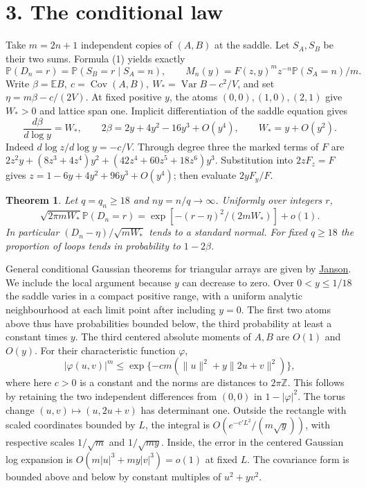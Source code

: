 \documentclass[11pt,letterpaper]{article}
\newcommand{\Prb}{\mathbb P}
\newcommand{\EE}{\mathbb E}
\newcommand{\Var}{\operatorname{Var}}
\newcommand{\Cov}{\operatorname{Cov}}
\newtheorem{theorem}{Theorem}
\begin{document}
\section*{3. The conditional law}
Take \(m=2n+1\) independent copies of \((A,B)\) at the saddle.
Let \(S_A,S_B\) be their two sums. Formula (1) yields exactly
\[
 \Prb(D_n=r)=\Prb(S_B=r\mid S_A=n),\qquad
 M_n(y)=F(z,y)^m z^{-n}\Prb(S_A=n)/m.
 \tag{5}
\]
Write \(\beta=\EE B,\ c=\Cov(A,B),\ W_*=\Var B-c^2/V\), and set
\(\eta=m\beta-c/(2V)\). At fixed positive \(y\), the atoms
\((0,0),(1,0),(2,1)\) give \(W_*>0\) and lattice span one.
Implicit differentiation of the saddle equation gives
\[
 \frac{d\beta}{d\log y}=W_*,\qquad
 2\beta=2y+4y^2-16y^3+O(y^4),\qquad W_*=y+O(y^2).
 \tag{6}
\]
Indeed \(d\log z/d\log y=-c/V\). Through degree three the marked
terms of \(F\) are \(2z^2y+(8z^3+4z^4)y^2+
(42z^4+60z^5+18z^6)y^3\). Substitution into \(2zF_z=F\)
gives \(z=1-6y+4y^2+96y^3+O(y^4)\); then evaluate \(2yF_y/F\).
\begin{theorem}
Let \(q=q_n\ge18\) and \(ny=n/q\to\infty\). Uniformly over
integers \(r\),
\[
 \sqrt{2\pi mW_*}\Prb(D_n=r)
 =\exp[-(r-\eta)^2/(2mW_*)]+o(1).
 \tag{7}
\]
In particular \((D_n-\eta)/\sqrt{mW_*}\) tends to a standard normal.
For fixed \(q\ge18\) the proportion of loops tends in probability
to \(1-2\beta\).
\end{theorem}
General conditional Gaussian theorems for triangular arrays are given
by \href{https://doi.org/10.1239/jap/996986753}{Janson}.
We include the local argument because \(y\) can decrease to zero.
Over \(0<y\le1/18\) the saddle varies in a compact positive range,
with a uniform analytic neighbourhood at each limit point after
including \(y=0\). The first two atoms above thus have probabilities
bounded below, the third probability at least a constant times \(y\).
The third centered absolute moments of \(A,B\) are \(O(1)\) and
\(O(y)\). For their characteristic function \(\varphi\),
\[
 |\varphi(u,v)|^m\le
 \exp\{-cm(\|u\|^2+y\|2u+v\|^2)\},
\]
where here \(c>0\) is a constant and the norms are distances to
\(2\pi\mathbb Z\). This follows by retaining the two independent
differences from \((0,0)\) in \(1-|\varphi|^2\).
The torus change \((u,v)\mapsto(u,2u+v)\) has determinant one.
Outside the rectangle with scaled coordinates bounded by \(L\),
the integral is \(O(e^{-c'L^2}/(m\sqrt y))\), with respective
scales \(1/\sqrt m\) and \(1/\sqrt{my}\).
Inside, the error in the centered Gaussian log expansion is
\(O(m|u|^3+my|v|^3)=o(1)\) at fixed \(L\). The covariance form
is bounded above and below by constant multiples of \(u^2+yv^2\).
\end{document}
